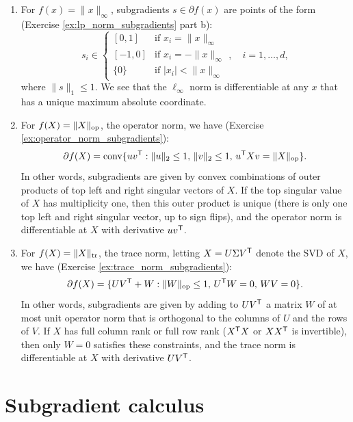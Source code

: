 \begin{Example}
\begin{enumerate}[label=\alph*., ref=\alph*]
\item {} 
  For $f(x) = \|x\|_\infty$, subgradients $s \in \partial f(x)$ are points of
  the form (Exercise \ref{ex:lp_norm_subgradients} part b): 
  \[
  s_i \in \begin{cases}
  [0,1] & \text{if $x_i = \|x\|_\infty$} \\   
  [-1,0] & \text{if $x_i = -\|x\|_\infty$} \\
  \{0\} & \text{if $|x_i| < \|x\|_\infty$}
  \end{cases}, \quad i=1,\ldots,d,
  \]
  where $\|s\|_1 \leq 1$. We see that the $\ell_\infty$ norm is differentiable
  at any $x$ that has a unique maximum absolute coordinate.  

\item {} 
  For $f(X) = \|X\|_{\mathrm{op}}$, the operator norm, we have (Exercise
  \ref{ex:operator_norm_subgradients}):  
  \[
  \partial f(X) = \operatorname{conv} \{ u v^{\mathsf{T}} : \|u\|_2 \leq 1, \, \|v\|_2 \leq 1, \, u^{\mathsf{T}} X
  v =  \|X\|_{\mathrm{op}} \}.  
  \]
  In other words, subgradients are given by convex combinations of outer 
  products of top left and right singular vectors of $X$. If the top singular
  value of $X$ has multiplicity one, then this outer product is unique (there is
  only one top left and right singular vector, up to sign flips), and the
  operator norm is differentiable at $X$ with derivative $u v^{\mathsf{T}}$.         

\item {}  
  For $f(X) = \|X\|_{\operatorname{tr}}$, the trace norm, letting $X = U \Sigma V^{\mathsf{T}}$ denote
  the SVD of $X$, we have (Exercise \ref{ex:trace_norm_subgradients}):   
  \[
  \partial f(X) = \{ U V^{\mathsf{T}} + W: \|W\|_{\mathrm{op}} \leq 1, \, U^{\mathsf{T}} W = 0, \, W V = 0
  \}. 
  \]
  In other words, subgradients are given by adding to $U V^{\mathsf{T}}$ a matrix $W$ of
  at most unit operator norm that is orthogonal to the columns of $U$ and the
  rows of $V$. If $X$ has full column rank or full row rank ($X^{\mathsf{T}} X$ or $X
  X^{\mathsf{T}}$ is invertible), then only $W=0$ satisfies these constraints, and the
  trace norm is differentiable at $X$ with derivative $U V^{\mathsf{T}}$.    
\end{enumerate}
\end{Example}

\section{Subgradient calculus}

